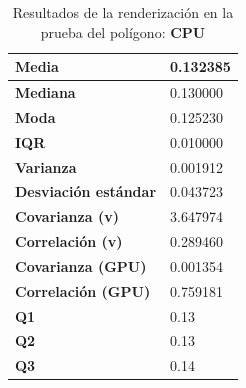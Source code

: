 \begin{table}[htp]
\centering


    
    \begin{center}
    \begin{tabular}{ | l | l | }
        
        
        \hline
        \textbf{Media}  & 0.132385 \\
        \hline
        \textbf{Mediana} & 0.130000 \\
        \hline
        \textbf{Moda} & 0.125230 \\
        \hline
        \textbf{IQR} & 0.010000 \\
        \hline
        \textbf{Varianza} & 0.001912 \\
        \hline
        \textbf{Desviación estándar} & 0.043723 \\
        \hline
        \textbf{Covarianza (v)} & 3.647974 \\
        \hline
        \textbf{Correlación (v)} & 0.289460 \\
        \hline
        \textbf{Covarianza (GPU)} & 0.001354 \\
        \hline
        \textbf{Correlación (GPU)} & 0.759181 \\
        \hline
        \textbf{Q1} & 0.13 \\
        \hline
        \textbf{Q2} & 0.13 \\
        \hline
        \textbf{Q3} & 0.14 \\
        \hline
        
    \end{tabular} 
    \end{center}
    
    \caption{Resultados de la renderización en la prueba del polígono: \textbf{CPU}}
    
    \label{tbl:results-polygon-render-cpu}
\end{table}